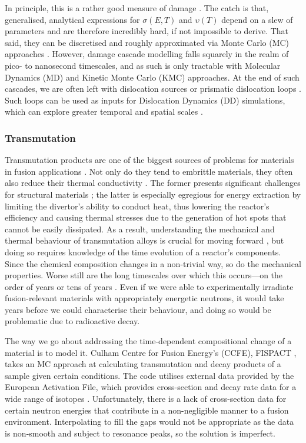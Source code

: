In principle, this is a rather good measure of damage \cite{dpa}. The catch is that, generalised, analytical expressions for $ \sigma(E,T) $ and $ \upsilon(T) $ depend on a slew of parameters and are therefore incredibly hard, if not impossible to derive. That said, they can be discretised and roughly approximated via Monte Carlo (MC) approaches \cite{srim, srimisbad, dpa}. However, damage cascade modelling falls squarely in the realm of pico- to nanosecond timescales, and as such is only tractable with Molecular Dynamics (MD) and Kinetic Monte Carlo (KMC) \cite{dmg_cascade1, colcas} approaches. At the end of such cascades, we are often left with dislocation sources or prismatic dislocation loops \cite{dmg_cascade_dln}. Such loops can be used as inputs for Dislocation Dynamics (DD) simulations, which can explore greater temporal and spatial scales \cite{fusmat1s}.

\subsubsection{Transmutation}
\label{sss:transmutation}

Transmutation products are one of the biggest sources of problems for materials in fusion applications \cite{fusmat1, mats_fusion1}. Not only do they tend to embrittle materials, they often also reduce their thermal conductivity \cite{transmute}. The former presents significant challenges for structural materials \cite{ods_rad_res}; the latter is especially egregious for energy extraction by limiting the divertor's ability to conduct heat, thus lowering the reactor's efficiency and causing thermal stresses due to the generation of hot spots that cannot be easily dissipated. As a result, understanding the mechanical and thermal behaviour of transmutation alloys is crucial for moving forward \cite{nirrhard, colcas, hardening}, but doing so requires knowledge of the time evolution of a reactor's components. Since the chemical composition changes in a non-trivial way, so do the mechanical properties. Worse still are the long timescales over which this occurs---on the order of years or tens of years \cite{transmute2}. Even if we were able to experimentally irradiate fusion-relevant materials with appropriately energetic neutrons, it would take years before we could characterise their behaviour, and doing so would be problematic due to radioactive decay.

The way we go about addressing the time-dependent compositional change of a material is to model it. Culham Centre for Fusion Energy's (CCFE), FISPACT \cite{fispact}, takes an MC approach at calculating transmutation and decay products of a sample given certain conditions. The code utilises external data provided by the European Activation File, which provides cross-section and decay rate data for a wide range of isotopes \cite{fispact_library}. Unfortunately, there is a lack of cross-section data for certain neutron energies that contribute in a non-negligible manner to a fusion environment. Interpolating to fill the gaps would not be appropriate as the data is non-smooth and subject to resonance peaks, so the solution is imperfect.

